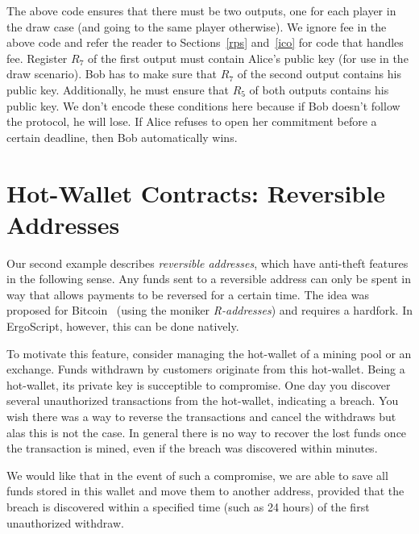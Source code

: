 \documentclass[11pt]{article}
\newcommand{\langname}{ErgoScript\xspace}
\begin{document}

The above code ensures that there must be two outputs, one for each player in the draw case (and going to the same player otherwise). We ignore fee in the above code and refer the reader to Sections~\ref{rps} and~\ref{ico} for code that handles fee. Register $R_7$ of the first output must contain Alice's public key (for use in the draw scenario). Bob has to make sure that $R_7$ of the second output contains his public key. Additionally, he must ensure that $R_5$ of both outputs contains his public key. We don't encode these conditions here because if Bob doesn't follow the protocol, he will lose. If Alice refuses to open her commitment before a certain deadline, then Bob automatically wins. 

\section{Hot-Wallet Contracts: Reversible Addresses}

Our second example describes {\em reversible addresses}, which have anti-theft features in the following sense. 
Any funds sent to a reversible address can only be spent in way that allows payments to be reversed for a certain time. The idea was proposed for Bitcoin~\cite{raddress} (using the moniker {\em R-addresses}) and requires a hardfork. In \langname, however, this can be done natively.

To motivate this feature, consider managing the hot-wallet of a mining pool or an exchange. Funds withdrawn by customers originate from this hot-wallet. Being a hot-wallet, its private key is succeptible to compromise. One day you discover several unauthorized transactions from the hot-wallet, indicating a breach. You wish there was a way to reverse the transactions and cancel the withdraws but alas this is not the case. In general there is no way to recover the lost funds once the transaction is mined, even if the breach was discovered within minutes. 

We would like that in the event of such a compromise, we are able to save all funds stored in this wallet and move them to another address, provided that the breach is discovered within a specified time (such as 24 hours) of the first unauthorized withdraw. 

\end{document}
